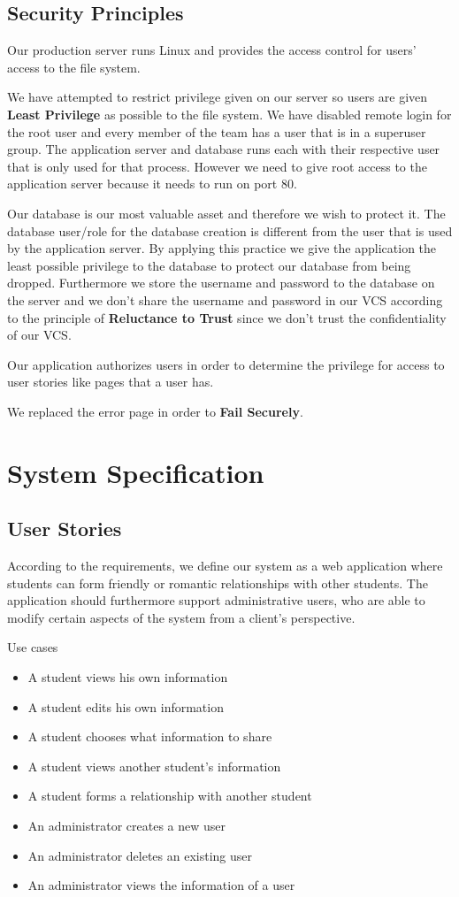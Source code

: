 \documentclass[a4paper]{article}
\begin{document}
\subsection{Security Principles}

Our production server runs Linux and provides the access control for users' access to the file system.

We have attempted to restrict privilege given on our server so users are given 
\textbf{Least Privilege} as possible to the file system. We have disabled remote login for the root user and every member of the team has a user that is in a superuser group. The application server and database runs each with their respective user that is only used for that process. However we need to give root access to the application server because it needs to run on port 80.


Our database is our most valuable asset and therefore we wish to protect it. The database user/role for the database creation is different from the user that is used by the application server. By applying this practice we give the application the least possible privilege to the database to protect our database from being dropped. Furthermore we store the username and password to the database on the server and we don't share the username and password in our VCS according to the principle of \textbf{Reluctance to Trust} since we don't trust the confidentiality of our VCS.

Our application authorizes users in order to determine the privilege for access to user stories like pages that a user has.

We replaced the error page in order to \textbf{Fail Securely}.

\section{System Specification}

\subsection{User Stories}
According to the requirements, we define our system as a web application where students can form friendly or romantic relationships with other students. The application should furthermore support administrative users, who are able to modify certain aspects of the system from a client's perspective.

Use cases
\begin{itemize}
\item A student views his own information
\item A student edits his own information
\item A student chooses what information to share
\item A student views another student’s information
\item A student forms a relationship with another student
\item An administrator creates a new user
\item An administrator deletes an existing user
\item An administrator views the information of a user
\end{itemize}
\end{document}
